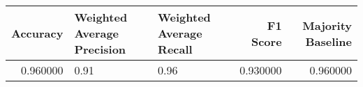 \begin{tabular}{rllrr}
\toprule
Accuracy & Weighted Average Precision & Weighted Average Recall & F1 Score & Majority Baseline \\
\midrule
0.960000 & 0.91 & 0.96 & 0.930000 & 0.960000 \\
\bottomrule
\end{tabular}
